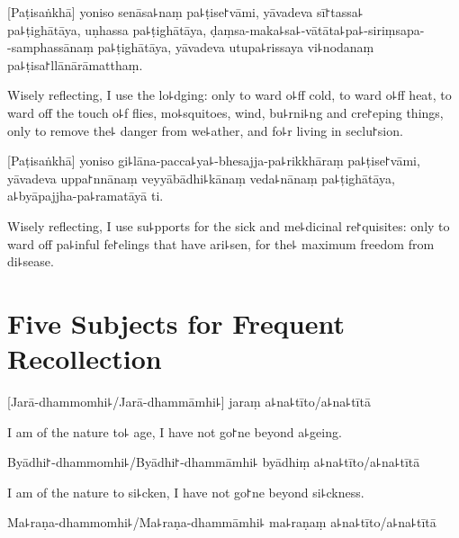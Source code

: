 [Paṭisaṅkhā] yoniso senāsa꜕naṃ pa꜕ṭise꜓vāmi, yāvadeva sī꜓tassa꜕\\
pa꜕ṭighātāya, uṇhassa pa꜕ṭighātāya, ḍaṃsa-maka꜕sa꜕-vātāta꜕pa꜕-siriṃsapa-\\
-samphassānaṃ pa꜕ṭighātāya, yāvadeva utupa꜕rissaya vi꜕nodanaṃ pa꜕ṭisa꜓llānārāmatthaṃ.

\begin{english}
  Wisely reflecting, I use the lo꜕dging: only to ward o꜕ff cold, to ward o꜕ff heat, to ward off the touch o꜕f flies, mo꜕squitoes, wind, bu꜕rni꜕ng and cre꜓eping things, only to remove the꜕ danger from we꜕ather, and fo꜕r living in seclu꜓sion.
\end{english}

[Paṭisaṅkhā] yoniso gi꜕lāna-pacca꜕ya꜕-bhesajja-pa꜕rikkhāraṃ pa꜕ṭise꜓vāmi, yāvadeva uppa꜓nnānaṃ veyyābādhi꜕kānaṃ veda꜕nānaṃ pa꜕ṭighātāya, a꜕byāpajjha-pa꜕ramatāyā ti.

\begin{english}
  Wisely reflecting, I use su꜕pports for the sick and me꜕dicinal re꜓quisites: only to ward off pa꜕inful fe꜓elings that have ari꜕sen, for the꜕ maximum freedom from di꜕sease.
\end{english}

\chapter[Five Subjects]{Five Subjects for Frequent Recollection}%



\begin{leader}
\end{leader}

[Jarā-dhammomhi꜕/Jarā-dhammāmhi꜕] jaraṃ a꜕na꜕tīto/a꜕na꜕tītā

\begin{english}
  I am of the nature to꜕ age, I have not go꜓ne beyond a꜕geing.
\end{english}

Byādhi꜓-dhammomhi꜕/Byādhi꜓-dhammāmhi꜕ byādhiṃ a꜕na꜕tīto/a꜕na꜕tītā

\begin{english}
  I am of the nature to si꜕cken, I have not go꜓ne beyond si꜕ckness.
\end{english}

Ma꜕raṇa-dhammomhi꜕/Ma꜕raṇa-dhammāmhi꜕ ma꜕raṇaṃ a꜕na꜕tīto/a꜕na꜕tītā

